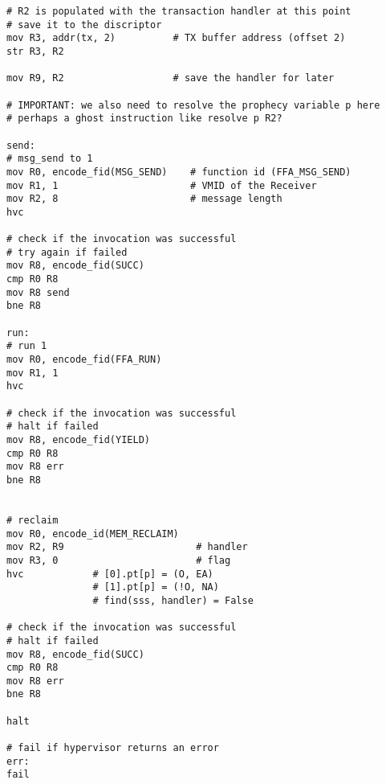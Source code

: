 \documentclass{article}
\begin{document}
\begin{lstlisting}[caption={VM 0}]
# R2 is populated with the transaction handler at this point
# save it to the discriptor
mov R3, addr(tx, 2)          # TX buffer address (offset 2)
str R3, R2

mov R9, R2                   # save the handler for later

# IMPORTANT: we also need to resolve the prophecy variable p here
# perhaps a ghost instruction like resolve p R2?

send:
# msg_send to 1
mov R0, encode_fid(MSG_SEND)    # function id (FFA_MSG_SEND)
mov R1, 1                       # VMID of the Receiver
mov R2, 8                       # message length
hvc

# check if the invocation was successful
# try again if failed
mov R8, encode_fid(SUCC)
cmp R0 R8
mov R8 send
bne R8

run:
# run 1
mov R0, encode_fid(FFA_RUN)
mov R1, 1
hvc

# check if the invocation was successful
# halt if failed
mov R8, encode_fid(YIELD)
cmp R0 R8
mov R8 err
bne R8


# reclaim
mov R0, encode_id(MEM_RECLAIM)
mov R2, R9                       # handler
mov R3, 0                        # flag
hvc            # [0].pt[p] = (O, EA)
               # [1].pt[p] = (!O, NA)
               # find(sss, handler) = False

# check if the invocation was successful
# halt if failed
mov R8, encode_fid(SUCC)
cmp R0 R8
mov R8 err
bne R8

halt

# fail if hypervisor returns an error
err:
fail

\end{lstlisting}
\end{document}
